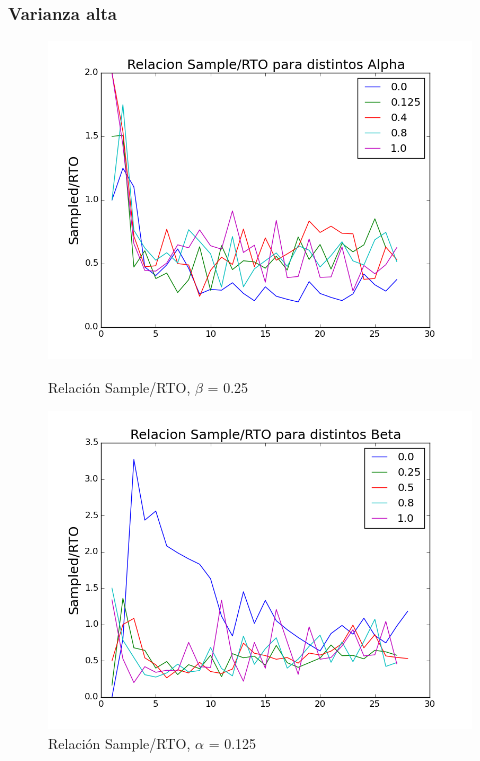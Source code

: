 \subsubsection{Varianza alta}

\begin{figure}[H]
\begin{minipage}{0.5\linewidth}
\includegraphics[width=\linewidth]{../src/alphavar5.png}
\caption{Relación Sample/RTO, $\beta$ = 0.25}\label{fig:alpha-var5-nodrop}
\end{minipage}
\hfill
\begin{minipage}{0.5\linewidth}
\includegraphics[width=\linewidth]{../src/betavar5.png}
\caption{Relación Sample/RTO, $\alpha$ = 0.125}\label{fig:beta-var5-nodrop}
\end{minipage}
\end{figure}


